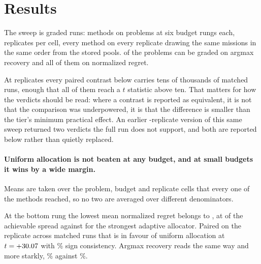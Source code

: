 \documentclass[11pt]{article}
\begin{document}
\section{Results}
\label{sec:results}


The sweep is \RsRows{} graded runs: \RsMethods{} methods on \RsProblems{} problems at six budget
rungs each, \RsReplicates{} replicates per cell, every method on every replicate drawing the same
missions in the same order from the stored pools. \RsGradeable{} of the problems can be graded on
argmax recovery and all of them on normalized regret.

At \RsReplicates{} replicates every paired contrast below carries tens of thousands of matched
runs, enough that all of them reach a $t$ statistic above ten. That matters for how the verdicts
should be read: where a contrast is reported as equivalent, it is not that the comparison was
underpowered, it is that the difference is smaller than the tier's minimum practical effect. An
earlier \RsPrevReplicates{}-replicate version of this same sweep returned two verdicts the full run
does not support, and both are reported below rather than quietly replaced.

\paragraph{Uniform allocation is not beaten at any budget, and at small budgets it wins by a wide
margin.} Means are taken over the \RsCells{} problem, budget and replicate cells that every one of
the \RsMethods{} methods reached, so no two are averaged over different denominators.

At the bottom rung the lowest mean normalized regret belongs to \RsCrossLow{}, at
\RsCrossLowUni{} of the achievable spread against \RsCrossLowAdapt{} for the strongest adaptive
allocator. Paired on the replicate across \RsCrossLowN{} matched runs that is \RsCrossLowEff{} in
favour of uniform allocation at $t = +30.07{}$ with \RsCrossLowSign{}\% sign consistency.
Argmax recovery reads the same way and more starkly, \RsCrossLowUniFound{}\% against
\RsCrossLowAdaptFound{}\%.
\end{document}
